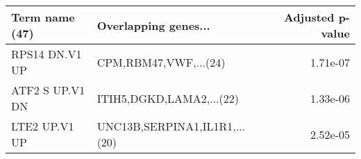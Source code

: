 \begin{tabular}{llr}
\toprule
 Term name (47) &          Overlapping genes... &  Adjusted p-value \\
\midrule
 RPS14 DN.V1 UP &         CPM,RBM47,VWF,...(24) &          1.71e-07 \\
ATF2 S UP.V1 DN &      ITIH5,DGKD,LAMA2,...(22) &          1.33e-06 \\
  LTE2 UP.V1 UP & UNC13B,SERPINA1,IL1R1,...(20) &          2.52e-05 \\
\bottomrule
\end{tabular}

